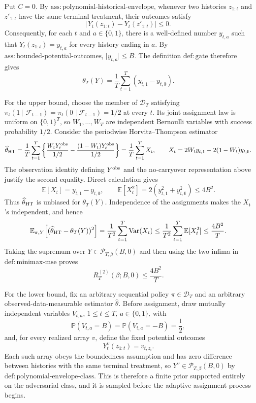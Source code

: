 Put \(C=0\).  By \(\mathrm{ass{:}polynomial\mbox{-}historical\mbox{-}envelope}\), whenever two histories \(z_{1:t}\) and \(z'_{1:t}\) have the same terminal treatment, their outcomes satisfy
\[
 \lvert Y_t(z_{1:t})-Y_t(z'_{1:t})\rvert\le 0.
\]
Consequently, for each \(t\) and \(a\in\{0,1\}\), there is a well-defined number \(y_{t,a}\) such that \(Y_t(z_{1:t})=y_{t,a}\) for every history ending in \(a\).  By \(\mathrm{ass{:}bounded\mbox{-}potential\mbox{-}outcomes}\), \(\lvert y_{t,a}\rvert\le B\).  The definition \(\mathrm{def{:}gate}\) therefore gives
\[
 \theta_T(Y)=\frac1T\sum_{t=1}^T(y_{t,1}-y_{t,0}).
\]

For the upper bound, choose the member of \(\mathcal D_T\) satisfying \(\pi_t(1\mid\mathcal F_{t-1})=\pi_t(0\mid\mathcal F_{t-1})=1/2\) at every \(t\).  Its joint assignment law is uniform on \(\{0,1\}^T\), so \(W_1,\ldots,W_T\) are independent Bernoulli variables with success probability \(1/2\).  Consider the periodwise Horvitz--Thompson estimator
\[
 \widehat\theta_{\rm HT}
 =\frac1T\sum_{t=1}^T
 \left\{\frac{W_tY_t^{\rm obs}}{1/2}
 -\frac{(1-W_t)Y_t^{\rm obs}}{1/2}\right\}
 =\frac1T\sum_{t=1}^T X_t,
 \qquad
 X_t=2W_ty_{t,1}-2(1-W_t)y_{t,0}.
\]
The observation identity defining \(Y^{\rm obs}\) and the no-carryover representation above justify the second equality.  Direct calculation gives
\[
 \mathbb E[X_t]=y_{t,1}-y_{t,0},
 \qquad
 \mathbb E[X_t^2]=2(y_{t,1}^2+y_{t,0}^2)\le 4B^2.
\]
Thus \(\widehat\theta_{\rm HT}\) is unbiased for \(\theta_T(Y)\).  Independence of the assignments makes the \(X_t\)'s independent, and hence
\[
 \mathbb E_{\pi,Y}\!\left[(\widehat\theta_{\rm HT}-\theta_T(Y))^2\right]
 =\frac1{T^2}\sum_{t=1}^T\operatorname{Var}(X_t)
 \le\frac1{T^2}\sum_{t=1}^T\mathbb E[X_t^2]
 \le\frac{4B^2}{T}.
\]
Taking the supremum over \(Y\in\mathcal P_{T,\beta}(B,0)\) and then using the two infima in \(\mathrm{def{:}minimax\mbox{-}mse}\) proves
\[
 R_T^{(2)}(\beta;B,0)\le \frac{4B^2}{T}.
\]

For the lower bound, fix an arbitrary sequential policy \(\pi\in\mathcal D_T\) and an arbitrary observed-data-measurable estimator \(\widehat\theta\).  Before assignment, draw mutually independent variables \(V_{t,a}\), \(1\le t\le T\), \(a\in\{0,1\}\), with
\[
 \mathbb P(V_{t,a}=B)=\mathbb P(V_{t,a}=-B)=\frac12,
\]
and, for every realized array \(v\), define the fixed potential outcomes
\[
 Y_t^v(z_{1:t})=v_{t,z_t}.
\]
Each such array obeys the boundedness assumption and has zero difference between histories with the same terminal treatment, so \(Y^v\in\mathcal P_{T,\beta}(B,0)\) by \(\mathrm{def{:}polynomial\mbox{-}envelope\mbox{-}class}\).  This is therefore a finite prior supported entirely on the adversarial class, and it is sampled before the adaptive assignment process begins.

